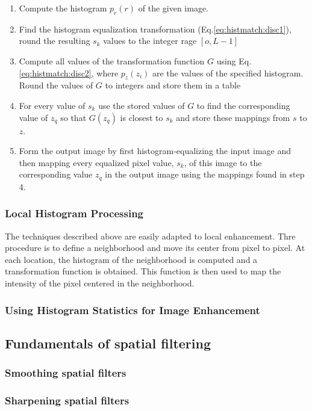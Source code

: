 \begin{enumerate}
  \item Compute the histogram $p_r(r)$ of the given image.
  \item Find the histogram equalization transformation (Eq.\ref{eq:histmatch:disc1}), round the resulting $s_k$
  	values to the integer rage $[o, L-1]$
  \item Compute all values of the transformation function $G$ using Eq.\ref{eq:histmatch:disc2}, where $p_z(z_i)$ are the values
  	of the specified histogram. Round the values of $G$ to integers and store them in a table
  \item For every value of $s_k$ use the stored values of $G$ to find the corresponding value of $z_q$ so that $G(z_q)$ is 
  	closest to $s_k$ and store these mappings from $s$ to $z$.
  \item Form the output image by first histogram-equalizing the input image and then mapping every equalized pixel value, $s_k$, of this
  	image to the corresponding value $z_q$ in the output image using the mappings found in step 4.
\end{enumerate}


\subsubsection{Local Histogram Processing}
The techniques described above are easily adapted to local enhancement. Thre procedure is to define a neighborhood and move its center from pixel to pixel.
At each location, the histogram of the neighborhood is computed and a transformation function is obtained. This function is then used to map the intensity
of the pixel centered in the neighborhood.


\subsubsection{Using Histogram Statistics for Image Enhancement}



\subsection{Fundamentals of spatial filtering}
\subsubsection{Smoothing spatial filters}
\subsubsection{Sharpening spatial filters}
